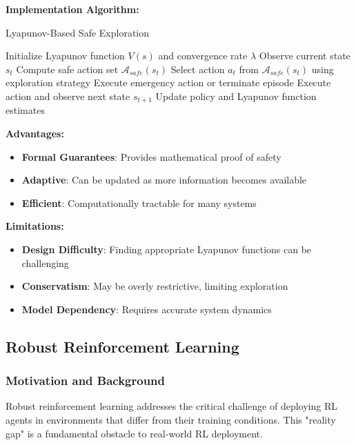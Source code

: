 \documentclass[12pt]{article}
\begin{document}
{{{{\textbf{Implementation Algorithm:}
\begin{algorithm}[H]
\caption{Lyapunov-Based Safe Exploration}
\begin{algorithmic}[1]
\STATE Initialize Lyapunov function $V(s)$ and convergence rate $\lambda$
    \STATE Observe current state $s_t$
    \STATE Compute safe action set $\mathcal{A}_{safe}(s_t)$
        \STATE Select action $a_t$ from $\mathcal{A}_{safe}(s_t)$ using exploration strategy
    \ELSE
        \STATE Execute emergency action or terminate episode
    \ENDIF
    \STATE Execute action and observe next state $s_{t+1}$
    \STATE Update policy and Lyapunov function estimates
\ENDFOR
\end{algorithmic}
\end{algorithm}

\textbf{Advantages:}
\begin{itemize}
\item \textbf{Formal Guarantees}: Provides mathematical proof of safety
\item \textbf{Adaptive}: Can be updated as more information becomes available
\item \textbf{Efficient}: Computationally tractable for many systems
\end{itemize}

\textbf{Limitations:}
\begin{itemize}
\item \textbf{Design Difficulty}: Finding appropriate Lyapunov functions can be challenging
\item \textbf{Conservatism}: May be overly restrictive, limiting exploration
\item \textbf{Model Dependency}: Requires accurate system dynamics
\end{itemize}

\subsection{Robust Reinforcement Learning}

\subsubsection{Motivation and Background}

Robust reinforcement learning addresses the critical challenge of deploying RL agents in environments that differ from their training conditions. This "reality gap" is a fundamental obstacle to real-world RL deployment.

}}}}
\end{document}
